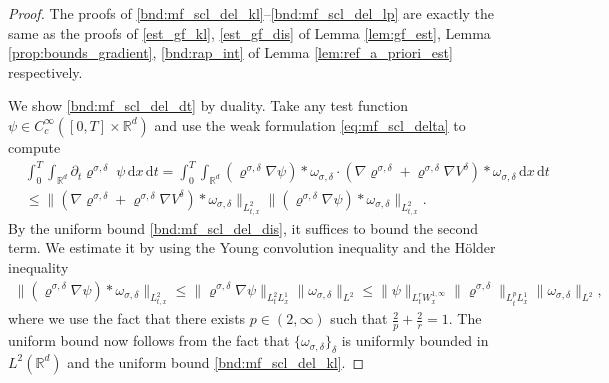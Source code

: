 \documentclass[reqno, 11pt]{amsart}
\numberwithin{equation}{section}
\theoremstyle{definition}
\begin{document}
\begin{proof}
    The proofs of \ref{bnd:mf_scl_del_kl}--\ref{bnd:mf_scl_del_lp} are exactly the same as the proofs of \ref{est_gf_kl}, \ref{est_gf_dis} of Lemma \ref{lem:gf_est}, Lemma \ref{prop:bounds_gradient}, \ref{bnd:rap_int} of Lemma \ref{lem:ref_a_priori_est} respectively.
    
    We show \ref{bnd:mf_scl_del_dt} by duality. Take any test function $\psi\in C_c^\infty([0,T]\times \mathbb{R}^{d})$ and use the weak formulation \eqref{eq:mf_scl_delta} to compute
    \begin{align*}
        &\int_0^T\int_{\mathbb{R}^{d}}\partial_t\varrho^{\sigma,\delta}\;\psi\,\mathrm{d} x\,\mathrm{d} t
        =\int_0^T\int_{\mathbb{R}^{d}}(\varrho^{\sigma,\delta}\nabla\psi)\ast\omega_{\sigma,\delta}\cdot (\nabla\varrho^{\sigma,\delta}+\varrho^{\sigma,\delta}\nabla V^\delta)\ast\omega_{\sigma,\delta}\,\mathrm{d} x\,\mathrm{d} t\\
        &\leq \|(\nabla\varrho^{\sigma,\delta}+\varrho^{\sigma,\delta}\nabla V^\delta)\ast \omega_{\sigma,\delta}\|_{L_{t,x}^2}
        \|(\varrho^{\sigma,\delta}\nabla\psi)\ast\omega_{\sigma,\delta}\|_{L_{t,x}^2}.
    \end{align*}
    By the uniform bound \ref{bnd:mf_scl_del_dis}, it suffices to bound the second term. We estimate it by using the Young convolution inequality and the H\"older inequality
    \begin{align*}
        \|(\varrho^{\sigma,\delta}\nabla\psi)\ast\omega_{\sigma,\delta}\|_{L_{t,x}^2}
        \leq \|\varrho^{\sigma,\delta}\nabla\psi\|_{L_t^2 L_x^1}\|\omega_{\sigma,\delta}\|_{L^2}
        \leq \|\psi\|_{L_t^r W_x^{1,\infty}}\|\varrho^{\sigma,\delta}\|_{L_t^p L_x^1}\|\omega_{\sigma,\delta}\|_{L^2},
    \end{align*}
    where we use the fact that there exists $p\in(2,\infty)$ such that $\tfrac{2}{p}+\tfrac{2}{r}=1$. The uniform bound now follows from the fact that $\{\omega_{\sigma,\delta}\}_\delta$ is uniformly bounded in $L^2(\mathbb{R}^{d})$ and the uniform bound \ref{bnd:mf_scl_del_kl}.
\end{proof}
\end{document}
